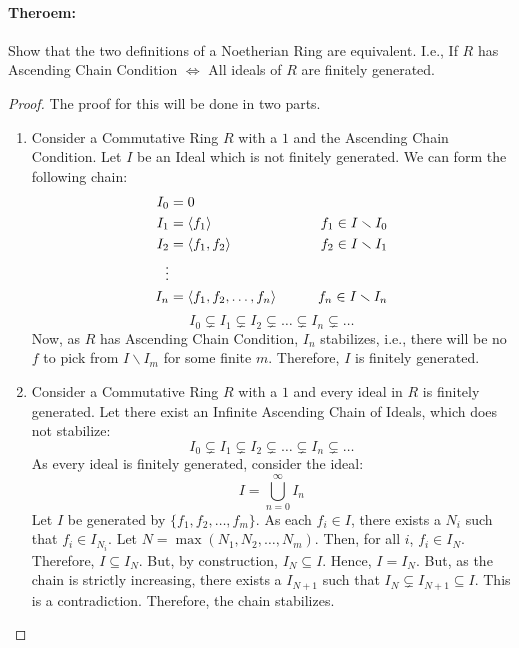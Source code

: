 \documentclass[12pt, oneside]{book}
\DeclarePairedDelimiter{\spanset}{\langle}{\rangle}
\begin{document}
\paragraph{Theroem:} Show that the two definitions of a Noetherian Ring are equivalent.
I.e., If \(R\) has Ascending Chain Condition \(\Leftrightarrow\) All ideals of \(R\) are finitely generated.
\begin{proof} The proof for this will be done in two parts.
    \begin{enumerate}[label=Part \arabic*:, leftmargin=25pt, itemindent=\parindent, listparindent=\parindent]
        \item Consider a Commutative Ring \(R\) with a \(1\) and the Ascending Chain Condition.
            Let \(I\) be an Ideal which is not finitely generated.
            We can form the following chain:
            \begin{align*}
                I_0 &= 0 \\
                I_1 &= \spanset{f_1} \qquad& f_1 \in I \smallsetminus I_0 \\
                I_2 &= \spanset{f_1, f_2} \qquad& f_2 \in I \smallsetminus I_1 \\
                \vdots\\
                I_n &= \spanset{f_1, f_2, \dots, f_n} \qquad& f_n \in I \smallsetminus I_n
            \end{align*}
            \[I_0 \subsetneq I_1 \subsetneq I_2 \subsetneq \dots \subsetneq I_n \subsetneq \dots\]
            Now, as \(R\) has Ascending Chain Condition, \(I_n\) stabilizes, i.e., there will be no \(f\) to pick from \(I \smallsetminus I_m\) for some finite \(m\).
            Therefore, \(I\) is finitely generated.
        \item Consider a Commutative Ring \(R\) with a \(1\) and every ideal in \(R\) is finitely generated.
            Let there exist an Infinite Ascending Chain of Ideals, which does not stabilize:
            \[I_0 \subsetneq I_1 \subsetneq I_2 \subsetneq \dots \subsetneq I_n \subsetneq \dots\]
            As every ideal is finitely generated, consider the ideal:
            \[I = \bigcup_{n=0}^{\infty} I_n\]
            Let \(I\) be generated by \(\{f_1, f_2, \dots, f_m\}\).
            As each \(f_i \in I\), there exists a \(N_i\) such that \(f_i \in I_{N_i}\).
            Let \(N = \max(N_1, N_2, \dots, N_m)\).
            Then, for all \(i\), \(f_i \in I_N\).
            Therefore, \(I \subseteq I_N\).
            But, by construction, \(I_N \subseteq I\).
            Hence, \(I = I_N\).
            But, as the chain is strictly increasing, there exists a \(I_{N+1}\) such that \(I_N \subsetneq I_{N+1} \subseteq I\).
            This is a contradiction.
            Therefore, the chain stabilizes.
    \end{enumerate}
\end{proof}
\end{document}
